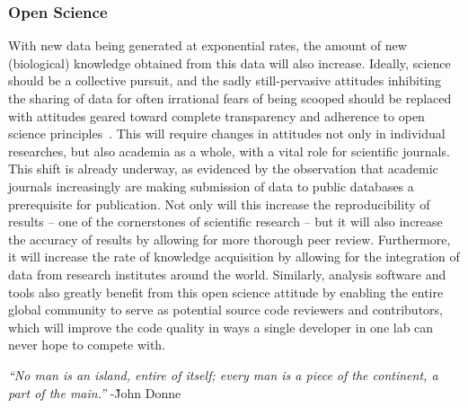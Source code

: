 \subsubsection{Open Science}
With new data being generated at exponential rates, the amount of new (biological) knowledge obtained from this data will also increase.
Ideally, science should be a collective pursuit, and the sadly still-pervasive attitudes inhibiting the sharing of data for often irrational fears of being scooped should be replaced with attitudes geared toward complete transparency and adherence to open science principles~\cite{nosek2015promoting}.
This will require changes in attitudes not only in individual researches, but also academia as a whole, with a vital role for scientific journals.
This shift is already underway, as evidenced by the observation that academic journals increasingly are making submission of data to public databases a prerequisite for publication.
Not only will this increase the reproducibility of results -- one of the cornerstones of scientific research -- but it will also increase the accuracy of results by allowing for more thorough peer review.
Furthermore, it will increase the rate of knowledge acquisition by allowing for the integration of data from research institutes around the world.
Similarly, analysis software and tools also greatly benefit from this open science attitude by enabling the entire global community to serve as potential source code reviewers and contributors, which will improve the code quality in ways a single developer in one lab can never hope to compete with.


\begin{center}
\emph{``No man is an island, entire of itself; every man is a piece of the continent, a part of the main.''} -\~John Donne
\end{center}



